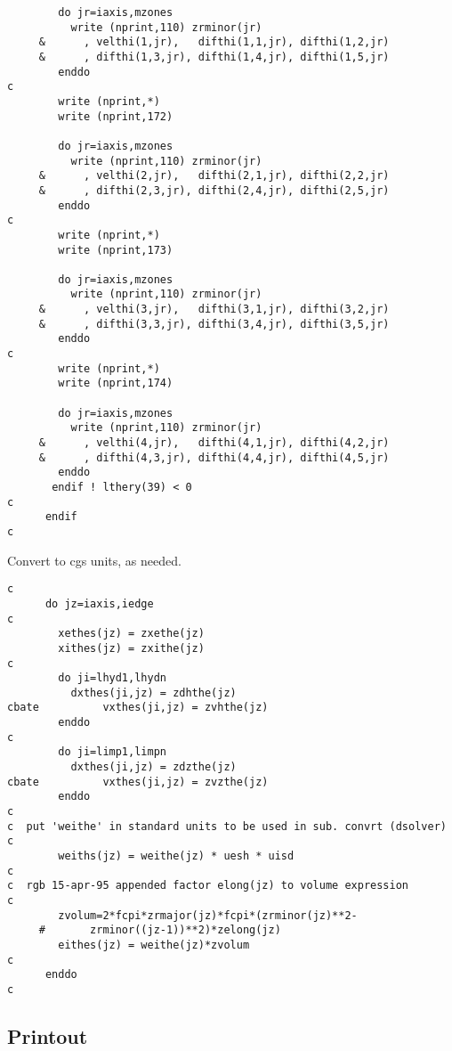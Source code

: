 \begin{verbatim}
        do jr=iaxis,mzones
          write (nprint,110) zrminor(jr)
     &      , velthi(1,jr),   difthi(1,1,jr), difthi(1,2,jr)
     &      , difthi(1,3,jr), difthi(1,4,jr), difthi(1,5,jr)
        enddo
c
        write (nprint,*)
        write (nprint,172)

        do jr=iaxis,mzones
          write (nprint,110) zrminor(jr)
     &      , velthi(2,jr),   difthi(2,1,jr), difthi(2,2,jr)
     &      , difthi(2,3,jr), difthi(2,4,jr), difthi(2,5,jr)
        enddo
c
        write (nprint,*)
        write (nprint,173)

        do jr=iaxis,mzones
          write (nprint,110) zrminor(jr)
     &      , velthi(3,jr),   difthi(3,1,jr), difthi(3,2,jr)
     &      , difthi(3,3,jr), difthi(3,4,jr), difthi(3,5,jr)
        enddo
c
        write (nprint,*)
        write (nprint,174)

        do jr=iaxis,mzones
          write (nprint,110) zrminor(jr)
     &      , velthi(4,jr),   difthi(4,1,jr), difthi(4,2,jr)
     &      , difthi(4,3,jr), difthi(4,4,jr), difthi(4,5,jr)
        enddo
       endif ! lthery(39) < 0
c
      endif
c
\end{verbatim}

Convert to cgs units, as needed.

\begin{verbatim}
c
      do jz=iaxis,iedge
c
        xethes(jz) = zxethe(jz)
        xithes(jz) = zxithe(jz)
c
        do ji=lhyd1,lhydn
          dxthes(ji,jz) = zdhthe(jz)
cbate          vxthes(ji,jz) = zvhthe(jz)
        enddo
c
        do ji=limp1,limpn
          dxthes(ji,jz) = zdzthe(jz)
cbate          vxthes(ji,jz) = zvzthe(jz)
        enddo
c
c  put 'weithe' in standard units to be used in sub. convrt (dsolver)
c
        weiths(jz) = weithe(jz) * uesh * uisd
c
c  rgb 15-apr-95 appended factor elong(jz) to volume expression
c
        zvolum=2*fcpi*zrmajor(jz)*fcpi*(zrminor(jz)**2-
     #       zrminor((jz-1))**2)*zelong(jz)
        eithes(jz) = weithe(jz)*zvolum
c
      enddo
c
\end{verbatim}

\subsection{Printout}

